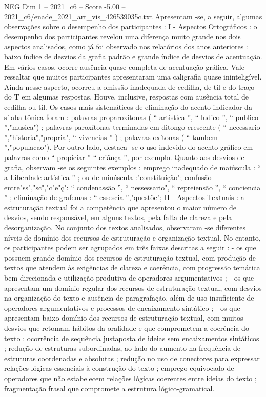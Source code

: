 \begin{textsample}{NEG Dim 1 – 2021\_c6 – Score -5.00 – 2021\_c6/enade\_2021\_art\_vis\_426539035c.txt}
Apresentam -se, a seguir, algumas observações sobre o desempenho dos participantes : I - Aspectos Ortográficos : o desempenho dos participantes revelou uma diferença muito grande nos dois aspectos analisados, como já foi observado nos relatórios dos anos anteriores : baixo índice de desvios da grafia padrão e grande índice de desvios de acentuação.
Em vários casos, ocorre ausência quase completa de acentuação gráfica.
Vale ressaltar que muitos participantes apresentaram uma caligrafia quase ininteligível.
Ainda nesse aspecto, ocorreu a omissão inadequada de cedilha, de til e do traço do T em algumas respostas.
Houve, inclusive, respostas com ausência total de cedilha ou til.
Os casos mais sistemáticos de eliminação do acento indicador da sílaba tônica foram : palavras proparoxítonas ( “ artistica ”, “ ludico ”, “ publico ”,"musica") ; palavras paroxítonas terminadas em ditongo crescente ( “ necessario ”,"historia","propria", “ vivencias ” ) ; palavras oxítonas ( “ tambem ”,"populacao").
Por outro lado, destaca -se o uso indevido do acento gráfico em palavras como “ propíciar ” “ criânça ”, por exemplo.
Quanto aos desvios de grafia, observam -se os seguintes exemplos : emprego inadequado de maiúscula : “ a Liberdade artística ” ; ou de minúscula :"constituição"; confusão entre"ss","sc","c"e"ç": “ condenassão ”, “ nessessario", “ repreiensão ”, “ conciencia ” ; eliminação de grafemas : “ essescia ”,"questõe"; II - Aspectos Textuais : a estruturação textual foi a competência que apresentou o maior número de desvios, sendo responsável, em alguns textos, pela falta de clareza e pela desorganização.
No conjunto dos textos analisados, observaram -se diferentes níveis de domínio dos recursos de estruturação e organização textual.
No entanto, os participantes podem ser agrupados em três faixas descritas a seguir : - os que possuem grande domínio dos recursos de estruturação textual, com produção de textos que atendem às exigências de clareza e coerência, com progressão temática bem direcionada e utilização produtiva de operadores argumentativos ; - os que apresentam um domínio regular dos recursos de estruturação textual, com desvios na organização do texto e ausência de paragrafação, além de uso insuficiente de operadores argumentativos e processos de encaixamento sintático ; - os que apresentam baixo domínio dos recursos de estruturação textual, com muitos desvios que retomam hábitos da oralidade e que comprometem a coerência do texto : ocorrência de sequência justaposta de ideias sem encaixamentos sintáticos ; redução de estruturas subordinadas, ao lado do aumento na frequência de estruturas coordenadas e absolutas ; redução no uso de conectores para expressar relações lógicas essenciais à construção do texto ; emprego equivocado de operadores que não estabelecem relações lógicas coerentes entre ideias do texto ; fragmentação frasal que compromete a estrutura lógico-gramatical.

\end{textsample}
